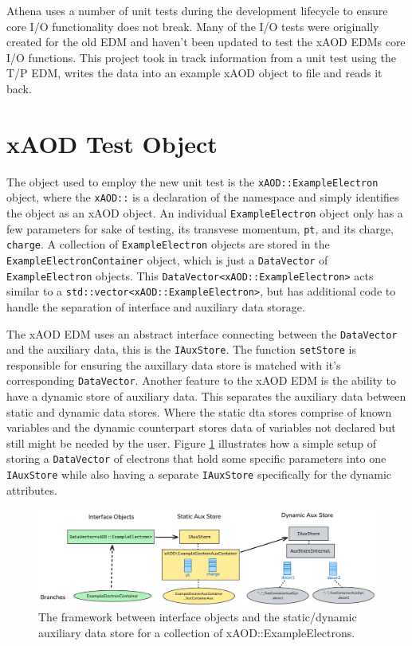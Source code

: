 Athena uses a number of unit tests during the development lifecycle to ensure core I/O functionality does not break.
Many of the I/O tests were originally created for the old EDM and haven't been updated to test the xAOD EDMs core I/O functions.
This project took in track information from a unit test using the T/P EDM, writes the data into an example xAOD object to file and reads it back.


\section{xAOD Test Object}
\label{sec:Mod_utests_xAOD_object}

The object used to employ the new unit test is the \verb|xAOD::ExampleElectron| object, where the \verb|xAOD::| is a declaration of the namespace and simply identifies the object as an xAOD object.
An individual \verb|ExampleElectron| object only has a few parameters for sake of testing, its transvese momentum, \verb|pt|, and its charge, \verb|charge|.
A collection of \verb|ExampleElectron| objects are stored in the \verb|ExampleElectronContainer| object, which is just a \verb|DataVector| of \verb|ExampleElectron| objects.\cite{Buckley_2015}
This \verb|DataVector<xAOD::ExampleElectron>| acts similar to a \verb|std::vector<xAOD::ExampleElectron>|, but has additional code to handle the separation of interface and auxiliary data storage. 

The xAOD EDM uses an abstract interface connecting between the \verb|DataVector| and the auxiliary data, this is the \verb|IAuxStore|. 
The function \verb|setStore| is responsible for ensuring the auxillary data store is matched with it's corresponding \verb|DataVector|.
Another feature to the xAOD EDM is the ability to have a dynamic store of auxiliary data.
This separates the auxiliary data between static and dynamic data stores. 
Where the static dta stores comprise of known variables and the dynamic counterpart stores data of variables not declared but still might be needed by the user. 
Figure \ref{fig:Mod_utests_aux_store} illustrates how a simple setup of storing a \verb|DataVector| of electrons that hold some specific parameters into one \verb|IAuxStore| while also having a separate \verb|IAuxStore| specifically for the dynamic attributes. 

\begin{figure}[h]
    \centering
    \includegraphics[width=\textwidth]{content/img/aux_store_better.png}
    \caption{The framework between interface objects and the static/dynamic auxiliary data store for a collection of xAOD::ExampleElectrons.}
    \label{fig:Mod_utests_aux_store}
\end{figure}





